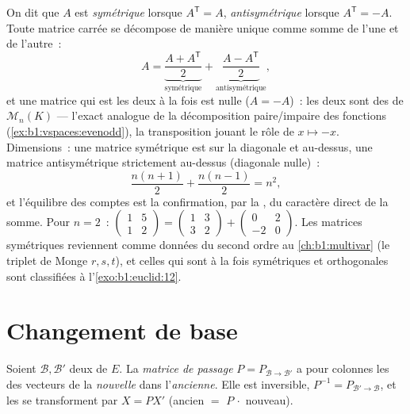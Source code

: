 \begin{example}
\label{ex:b1:matrices:symsplit}
On dit que $A$ est \emph{symétrique} lorsque $A^{\mathsf T} = A$,
\emph{antisymétrique} lorsque $A^{\mathsf T} = -A$. Toute matrice
carrée se décompose de manière unique comme somme de l'une et de
l'autre~:
\[
A = \underbrace{\frac{A + A^{\mathsf T}}{2}}_{\text{symétrique}}
+ \underbrace{\frac{A - A^{\mathsf T}}{2}}_{\text{antisymétrique}},
\]
et une matrice qui est les deux à la fois est nulle ($A = -A$)~: les
deux  sont des  de
$\mathcal{M}_n(K)$ --- l'exact analogue de la décomposition
paire/impaire des fonctions
(\cref{ex:b1:vspaces:evenodd}), la transposition jouant le rôle de
$x \mapsto -x$. Dimensions~: une matrice symétrique est  sur la
diagonale et au-dessus, une matrice antisymétrique strictement
au-dessus (diagonale nulle)~:
\[
\frac{n(n+1)}{2} + \frac{n(n-1)}{2} = n^2 ,
\]
et l'équilibre des comptes est la confirmation, par la , du caractère direct de la somme. Pour $n = 2$~:
$\begin{pmatrix} 1 & 5\\ 1 &
2\end{pmatrix} = \begin{pmatrix} 1 & 3\\ 3 & 2\end{pmatrix} +
\begin{pmatrix} 0 & 2\\ -2 & 0\end{pmatrix}$. Les matrices
symétriques reviennent comme données du second ordre au
\cref{ch:b1:multivar} (le triplet de Monge $r, s, t$), et celles qui
sont à la fois symétriques et orthogonales sont classifiées à
l'\cref{exo:b1:euclid:12}.
\end{example}

\section{Changement de base}

\begin{definition}\label{def:b1:matrices:changeofbasis}
Soient $\mathcal{B}, \mathcal{B}'$ deux  de $E$. La \emph{matrice
de passage} $P =
P_{\mathcal{B}\to\mathcal{B}'}$ a pour colonnes les  des
vecteurs de la \emph{nouvelle}  dans l'\emph{ancienne}. Elle est
inversible, $P^{-1} = P_{\mathcal{B}'\to\mathcal{B}}$, et les
 se transforment par $X = PX'$ (ancien $=$ $P\,\cdot$ nouveau).
\end{definition}

